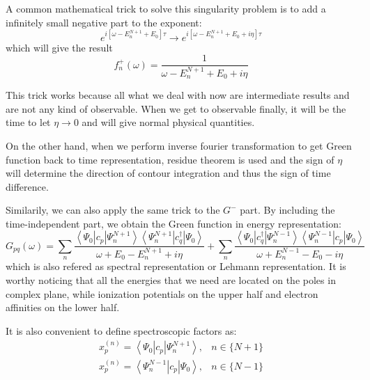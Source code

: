 A common mathematical trick to solve this singularity problem is to add a infinitely small negative part to the exponent:
\begin{equation}
e^{i\left[\omega-E_{n}^{N+1}+E_{0}\right] \tau} \rightarrow e^{i\left[\omega-E_{n}^{N+1}+E_{0}+i\eta\right] \tau}
\end{equation}
which will give the result
\begin{equation}
f_{n}^{+}(\omega)=\frac{1}{\omega-E_{n}^{N+1}+E_{0}+i \eta}
\end{equation}

This trick works because all what we deal with now are intermediate results and are not any kind of observable.
When we get to observable finally, it will be the time to let $\eta \rightarrow 0$ and will give normal physical quantities.

On the other hand, when we perform inverse fourier transformation to get Green function back to time representation, residue theorem is used and the sign of $\eta$ will determine the direction of contour integration and thus the sign of time difference.

Similarily, we can also apply the same trick to the $G^{-}$ part.
By including the time-independent part, we obtain the Green function in energy representation:
\begin{equation}
G_{p q}(\omega)=\sum_{n} \frac{\left\langle\Psi_{0}\left|c_{p}\right| \Psi_{n}^{N+1}\right\rangle\left\langle\Psi_{n}^{N+1}\left|c_{q}^{\dagger}\right| \Psi_{0}\right\rangle}{\omega+E_{0}-E_{n}^{N+1}+i \eta}+\sum_{n} \frac{\left\langle\Psi_{0}\left|c_{q}^{\dagger}\right| \Psi_{n}^{N-1}\right\rangle\left\langle\Psi_{n}^{N-1}\left|c_{p}\right| \Psi_{0}\right\rangle}{\omega+E_{n}^{N-1}-E_{0}-i \eta}
\end{equation}
which is also refered as spectral representation or Lehmann representation.
It is worthy noticing that all the energies that we need are located on the poles in complex plane, while ionization potentials on the upper half and electron affinities on the lower half.

It is also convenient to define spectroscopic factors as:
\begin{equation}
\begin{array}{ll}{x_{p}^{(n)}=\left\langle\Psi_{0}\left|c_{p}\right| \Psi_{n}^{N+1}\right\rangle,} & { n \in\{N+1\}} \\ {x_{p}^{(n)}=\left\langle\Psi_{n}^{N-1}\left|c_{p}\right| \Psi_{0}\right\rangle,} & { n \in\{N-1\}}\end{array}
\end{equation}

